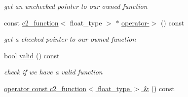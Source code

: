 \begin{DoxyCompactItemize}
\begin{DoxyCompactList}\small\item\em get an unchecked pointer to our owned function \end{DoxyCompactList}\item 
\hypertarget{classc2__const__ptr_a1a15e6786744bcebbe3bc8f0d53ad79d}{const \hyperlink{classc2__function}{c2\-\_\-function}$<$ float\-\_\-type $>$ $\ast$ \hyperlink{classc2__const__ptr_a1a15e6786744bcebbe3bc8f0d53ad79d}{operator-\/$>$} () const }\label{classc2__const__ptr_a1a15e6786744bcebbe3bc8f0d53ad79d}

\begin{DoxyCompactList}\small\item\em get a checked pointer to our owned function \end{DoxyCompactList}\item 
\hypertarget{classc2__const__ptr_a658dc06f2a368d0fb0514b460d222863}{bool \hyperlink{classc2__const__ptr_a658dc06f2a368d0fb0514b460d222863}{valid} () const }\label{classc2__const__ptr_a658dc06f2a368d0fb0514b460d222863}

\begin{DoxyCompactList}\small\item\em check if we have a valid function \end{DoxyCompactList}\item 
\hypertarget{classc2__const__ptr_a504b8baffa3de2180d200aa7bfcaaa3e}{\hyperlink{classc2__const__ptr_a504b8baffa3de2180d200aa7bfcaaa3e}{operator const c2\-\_\-function$<$ float\-\_\-type $>$ \&} () const }\label{classc2__const__ptr_a504b8baffa3de2180d200aa7bfcaaa3e}


\end{DoxyCompactItemize}
